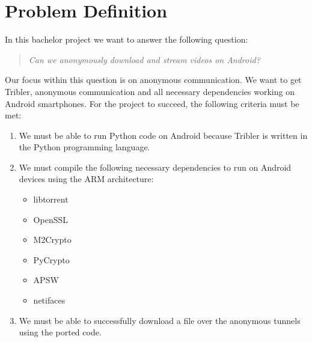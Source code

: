 \chapter{Problem Definition}
\label{cpt:problemdefinition}

In this bachelor project we want to answer the following question:

\begin{quote}
\emph{Can we anonymously download and stream videos on Android?}
\end{quote}

Our focus within this question is on anonymous communication. We want to get Tribler, anonymous communication and all necessary dependencies working on Android smartphones. For the project to succeed, the following criteria must be met:
\begin{enumerate}
\item We must be able to run Python code on Android because Tribler is written in the Python programming language.
\item We must compile the following necessary dependencies to run on Android devices using the ARM architecture:
\begin{itemize}
\item libtorrent
\item OpenSSL
\item M2Crypto
\item PyCrypto
\item APSW
\item netifaces
\end{itemize}
\item We must be able to successfully download a file over the anonymous tunnels using the ported code.
\end{enumerate}

